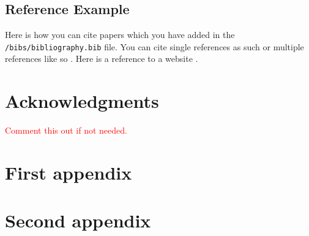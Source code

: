 \documentclass[a4paper,11pt, titlepage]{article}
\theoremstyle{definition}
\theoremstyle{plain}
\theoremstyle{remark}
\begin{document}
\subsection{Reference Example}

Here is how you can cite papers which you have added in the \verb!/bibs/bibliography.bib! file. You can cite single references as such \cite{Einstein1905} or multiple references like so \cite{Dirac1981,Einstein1905}. Here is a reference to a website \cite{Riemann2024}.


\section*{Acknowledgments}
\textcolor{red}{Comment this out if not needed.}

\appendix

\section{First appendix}
\label{sec:appendix1}

\section{Second appendix}
\label{sec:appendix2}



\end{document}

